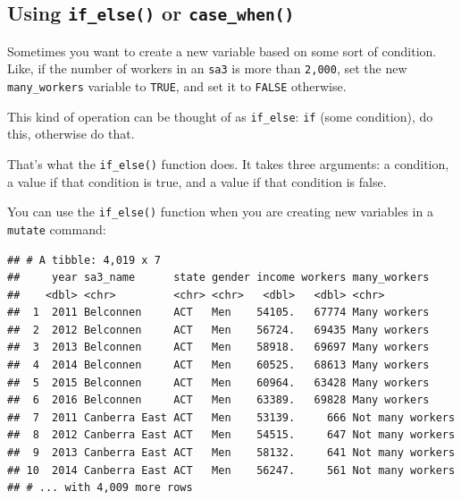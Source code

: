 \documentclass[]{book}
\newenvironment{Shaded}{\begin{snugshade}}{\end{snugshade}}
\newcommand{\DataTypeTok}[1]{\textcolor[rgb]{0.13,0.29,0.53}{#1}}
\newcommand{\DecValTok}[1]{\textcolor[rgb]{0.00,0.00,0.81}{#1}}
\newcommand{\KeywordTok}[1]{\textcolor[rgb]{0.13,0.29,0.53}{\textbf{#1}}}
\newcommand{\NormalTok}[1]{#1}
\newcommand{\OperatorTok}[1]{\textcolor[rgb]{0.81,0.36,0.00}{\textbf{#1}}}
\newcommand{\StringTok}[1]{\textcolor[rgb]{0.31,0.60,0.02}{#1}}
\begin{document}
\hypertarget{using-if_else-or-case_when}{%
\subsection{\texorpdfstring{Using \texttt{if\_else()} or \texttt{case\_when()}}{Using if\_else() or case\_when()}}\label{using-if_else-or-case_when}}

Sometimes you want to create a new variable based on some sort of condition. Like, if the number of workers in an \texttt{sa3} is more than \texttt{2,000}, set the new \texttt{many\_workers} variable to \texttt{TRUE}, and set it to \texttt{FALSE} otherwise.

This kind of operation can be thought of as \texttt{if\_else}: \texttt{if} (some condition), do this, otherwise do that.

That's what the \texttt{if\_else()} function does. It takes three arguments: a condition, a value if that condition is true, and a value if that condition is false.

You can use the \texttt{if\_else()} function when you are creating new variables in a \texttt{mutate} command:

\begin{Shaded}
\end{Shaded}

\begin{verbatim}
## # A tibble: 4,019 x 7
##     year sa3_name      state gender income workers many_workers    
##    <dbl> <chr>         <chr> <chr>   <dbl>   <dbl> <chr>           
##  1  2011 Belconnen     ACT   Men    54105.   67774 Many workers    
##  2  2012 Belconnen     ACT   Men    56724.   69435 Many workers    
##  3  2013 Belconnen     ACT   Men    58918.   69697 Many workers    
##  4  2014 Belconnen     ACT   Men    60525.   68613 Many workers    
##  5  2015 Belconnen     ACT   Men    60964.   63428 Many workers    
##  6  2016 Belconnen     ACT   Men    63389.   69828 Many workers    
##  7  2011 Canberra East ACT   Men    53139.     666 Not many workers
##  8  2012 Canberra East ACT   Men    54515.     647 Not many workers
##  9  2013 Canberra East ACT   Men    58132.     641 Not many workers
## 10  2014 Canberra East ACT   Men    56247.     561 Not many workers
## # ... with 4,009 more rows
\end{verbatim}
\end{document}
